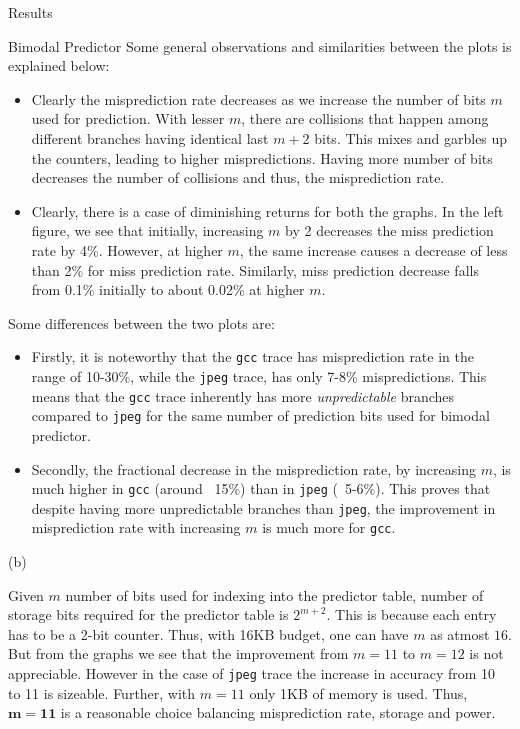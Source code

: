 \begin{section}{Results}
\begin{subsection}{Bimodal Predictor}
        Some general observations and similarities between the plots is explained below:
        \begin{itemize}
            \item Clearly the misprediction rate decreases as we increase the number of bits $m$ used for prediction. With lesser $m$, there are collisions that happen among different branches having identical last $m+2$ bits. This mixes and garbles up the counters, leading to higher mispredictions. Having more number of bits decreases the number of collisions and thus, the misprediction rate.
            \item Clearly, there is a case of diminishing returns for both the graphs. In the left figure, we see that initially, increasing $m$ by 2 decreases the miss prediction rate by 4\%. However, at higher $m$, the same increase causes a decrease of less than 2\% for miss prediction rate. Similarly, miss prediction decrease falls from 0.1\% initially to about 0.02\% at higher $m$.   %
        \end{itemize}

        Some differences between the two plots are:
        \begin{itemize}
            \item Firstly, it is noteworthy that the \texttt{gcc} trace has misprediction rate in the range of 10-30\%, while the \texttt{jpeg} trace, has only 7-8\% mispredictions. This means that the \texttt{gcc} trace inherently has more \textit{unpredictable} branches compared to \texttt{jpeg} for the same number of prediction bits used for bimodal predictor. 
            \item Secondly, the fractional decrease in the misprediction rate, by increasing $m$, is much higher in \texttt{gcc} (around ~15\%) than in \texttt{jpeg} (~5-6\%). This proves that despite having more unpredictable branches than \texttt{jpeg}, the improvement in misprediction rate with increasing $m$ is much more for \texttt{gcc}. 
        \end{itemize}


        \begin{center}
            (b) 
        \end{center}
        Given $m$ number of bits used for indexing into the predictor table, number of storage bits required for the predictor table is $2^{m+2}$. This is because each entry has to be a 2-bit counter. Thus, with 16KB budget, one can have $m$ as atmost $16$. But from the graphs we see that the improvement from $m=11$ to $m=12$ is not appreciable. However in the case of \texttt{jpeg} trace the increase in accuracy from 10 to 11 is sizeable. Further, with $m=11$ only 1KB of memory is used. Thus, $\mathbf{m=11}$ is a reasonable choice balancing misprediction rate, storage and power.
    \end{subsection}


\end{section}
